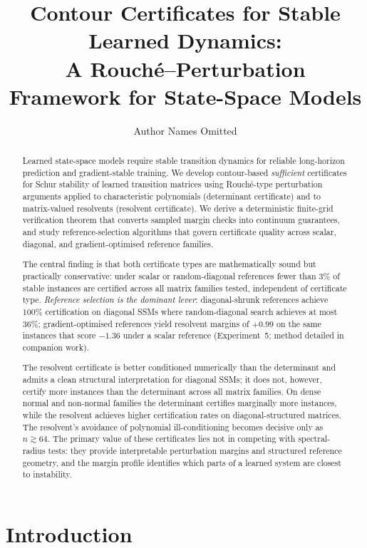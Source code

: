 \documentclass{article}
\title{Contour Certificates for Stable Learned Dynamics:\\
A Rouch\'e--Perturbation Framework for State-Space Models}
\author{Author Names Omitted}
\date{}
\theoremstyle{definition}
\begin{document}
\maketitle

\begin{abstract}
Learned state-space models require stable transition dynamics for reliable
long-horizon prediction and gradient-stable training.  We develop contour-based
\emph{sufficient} certificates for Schur stability of learned transition matrices
using Rouch\'e-type perturbation arguments applied to characteristic polynomials
(determinant certificate) and to matrix-valued resolvents (resolvent certificate).
We derive a deterministic finite-grid verification theorem that converts sampled
margin checks into continuum guarantees, and study reference-selection algorithms
that govern certificate quality across scalar, diagonal, and gradient-optimised
reference families.

The central finding is that both certificate types are mathematically sound but
practically conservative: under scalar or random-diagonal references fewer than
$3\%$ of stable instances are certified across all matrix families tested,
independent of certificate type.  \emph{Reference selection is the dominant
lever}: diagonal-shrunk references achieve $100\%$ certification on diagonal
SSMs where random-diagonal search achieves at most $36\%$; gradient-optimised
references yield resolvent margins of $+0.99$ on the same instances
that score $-1.36$ under a scalar reference
(Experiment~5; method detailed in companion work).

The resolvent certificate is better conditioned numerically than the determinant
and admits a clean structural interpretation for diagonal SSMs; it does not,
however, certify more instances than the determinant across all matrix families.
On dense normal and non-normal families the determinant certifies marginally
more instances, while the resolvent achieves higher certification rates on
diagonal-structured matrices.
The resolvent's avoidance of polynomial ill-conditioning becomes decisive only
as $n \gtrsim 64$.  The primary value of these certificates lies not in
competing with spectral-radius tests: they provide interpretable perturbation
margins and structured reference geometry, and the margin profile identifies
which parts of a learned system are closest to instability.
\end{abstract}

\section{Introduction}
\label{sec:intro}
\end{document}

